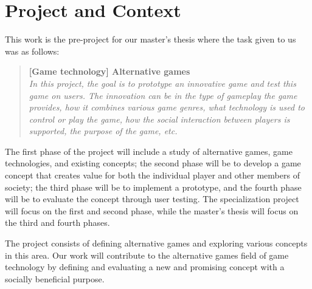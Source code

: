 \documentclass[../Main.tex]{subfiles}
\begin{document}
\section{Project and Context}
This work is the pre-project for our master’s thesis where the task given to us was as follows:

\blockquote{
    \textbf{[Game technology] Alternative games} \\
    \textit{In this project, the goal is to prototype an innovative game and test this game on users. The innovation can be in the type of gameplay the game provides, how it combines various game genres, what technology is used to control or play the game, how the social interaction between players is supported, the purpose of the game, etc.}
}

The first phase of the project will include a study of alternative games, game technologies, and existing concepts; the second phase will be to develop a game concept that creates value for both the individual player and other members of society; the third phase will be to implement a prototype, and the fourth phase will be to evaluate the concept through user testing. The specialization project will focus on the first and second phase, while the master’s thesis will focus on the third and fourth phases. 

The project consists of defining alternative games and exploring various concepts in this area. Our work will contribute to the alternative games field of game technology by defining and evaluating a new and promising concept with a socially beneficial purpose.


\biblio %
\end{document}
